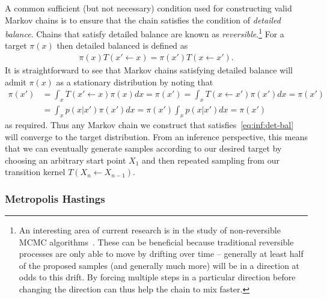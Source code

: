 A common sufficient (but not necessary) condition used for constructing valid Markov chains
is to ensure that the chain satisfies the condition of \emph{detailed balance}.  Chains that
satisfy detailed balance are known as 
\emph{reversible}.\footnote{An interesting area of current research is in the study
	of non-reversible MCMC algorithms~\cite{bouchard2015bouncy,bierkens2016zig}.  These can
	be beneficial because traditional reversible processes are only able to move by drifting over time -- generally
	at least half of the proposed samples (and generally much more) will be in a direction at odds to
	this drift.  By forcing multiple steps in a particular direction before changing the direction can thus
	help  the chain to mix faster.}
For a target $\pi(x)$ then detailed balanced is defined as
\begin{align}
\label{eq:inf:det-bal}
\pi(x) T(x' \leftarrow x) = \pi(x') T(x \leftarrow x').
\end{align}
It is straightforward to see that Markov chains satisfying detailed balance will admit $\pi(x)$
as a stationary distribution by noting that
\begin{align}
\pi(x') &= \int_{x} T(x' \leftarrow x) \pi(x)dx = \pi(x') = \int_{x} T(x \leftarrow x') \pi(x')dx = \pi(x') \\
&= \int_{x} p(x|x') \pi(x')dx = \pi(x') \int_{x} p(x|x') dx = \pi(x')
\end{align}
as required.  Thus any Markov chain we construct that satisfies~\eqref{eq:inf:det-bal}
will converge to the target distribution.  From an inference perspective, this means that
we can eventually generate samples according to our desired target by choosing an 
arbitrary start point $X_1$ and then repeated sampling from our transition kernel $T(X_n \leftarrow X_{n-1})$.

\subsubsection{Metropolis Hastings}
\label{sec:inf:foundation:mcmc:mh}

